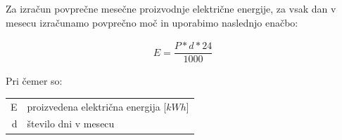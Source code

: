 Za izračun povprečne mesečne proizvodnje električne energije, za vsak dan v mesecu izračunamo povprečno moč in uporabimo naslednjo enačbo:

\begin{ceqn}
\begin{align}
E = \dfrac{P * d * 24}{1000}
\end{align}
\end{ceqn}

Pri čemer so:
\begin{table}[htb!]
\begin{tabular}{r|p{10cm}}
	E & proizvedena električna energija [$kWh$]\\
	d & število dni v mesecu \\
\end{tabular}
\end{table}


